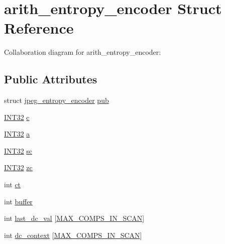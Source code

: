 \hypertarget{structarith__entropy__encoder}{}\section{arith\+\_\+entropy\+\_\+encoder Struct Reference}
\label{structarith__entropy__encoder}


Collaboration diagram for arith\+\_\+entropy\+\_\+encoder\+:
\subsection*{Public Attributes}
\begin{DoxyCompactItemize}
\item 
struct \hyperlink{structjpeg__entropy__encoder}{jpeg\+\_\+entropy\+\_\+encoder} \hyperlink{structarith__entropy__encoder_adaa616ab2a0f584358f8233775146d68}{pub}
\item 
\hyperlink{jmorecfg_8h_a0cb58e7e6f0bad369840a52e54a56ae0}{I\+N\+T32} \hyperlink{structarith__entropy__encoder_a84198956e6633b09fda5713b89164292}{c}
\item 
\hyperlink{jmorecfg_8h_a0cb58e7e6f0bad369840a52e54a56ae0}{I\+N\+T32} \hyperlink{structarith__entropy__encoder_afdfd4096eabee6a199afe6764b1ea35a}{a}
\item 
\hyperlink{jmorecfg_8h_a0cb58e7e6f0bad369840a52e54a56ae0}{I\+N\+T32} \hyperlink{structarith__entropy__encoder_aabd22ab89a4d488c9eebb109d91c3655}{sc}
\item 
\hyperlink{jmorecfg_8h_a0cb58e7e6f0bad369840a52e54a56ae0}{I\+N\+T32} \hyperlink{structarith__entropy__encoder_ad02520a5282d4d042bf39e8a50d6ddf8}{zc}
\item 
int \hyperlink{structarith__entropy__encoder_af636dab56c69b209b0bb5aefba723e80}{ct}
\item 
int \hyperlink{structarith__entropy__encoder_a404b730ace823b7212e4953146d02159}{buffer}
\item 
int \hyperlink{structarith__entropy__encoder_a60ba4c07f691b539ba51a25a20dc38ae}{last\+\_\+dc\+\_\+val} \mbox{[}\hyperlink{jpeglib_8h_adc7013da016c19051dc623fb3d8b35b4}{M\+A\+X\+\_\+\+C\+O\+M\+P\+S\+\_\+\+I\+N\+\_\+\+S\+C\+A\+N}\mbox{]}
\item 
int \hyperlink{structarith__entropy__encoder_a1f8bc39ac0327ddbf46c65434d0ceb75}{dc\+\_\+context} \mbox{[}\hyperlink{jpeglib_8h_adc7013da016c19051dc623fb3d8b35b4}{M\+A\+X\+\_\+\+C\+O\+M\+P\+S\+\_\+\+I\+N\+\_\+\+S\+C\+A\+N}\mbox{]}
\item 

\end{DoxyCompactItemize}
